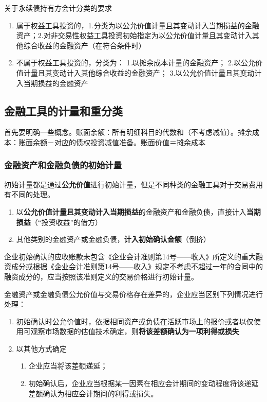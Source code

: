 \documentclass[UTF8,12pt]{ctexart}
\numberwithin{equation}{section} %
\numberwithin{figure}{section}
\numberwithin{table}{section}
\begin{document}
	关于永续债持有方会计分类的要求
	\begin{enumerate}
		\item 属于权益工具投资的，1.分类为以公允价值计量且其变动计入当期损益的金融资产；2.对非交易性权益工具投资初始指定为以公允价值计量且其变动计入其他综合收益的金融资产（在符合条件时）
		
		\item 不属于权益工具投资的，分类为：
		1.以摊余成本计量的金融资产；
		2.以公允价值计量且其变动计入其他综合收益的金融资产；
		3.以公允价值计量且其变动计入当期损益的金融资产
		
	\end{enumerate}
	
	\subsection{金融工具的计量和重分类}
	首先要明确一些概念。账面余额：所有明细科目的代数和（不考虑减值）。摊余成本：账面余额－对应的债权投资减值准备。账面价值＝摊余成本
	
	\subsubsection{金融资产和金融负债的初始计量}
	初始计量都是通过\textbf{公允价值}进行初始计量，但是不同种类的金融工具对于交易费用有不同的处理。
	\begin{enumerate}
		\item 以\textbf{公允价值计量且其变动计入当期损益}的金融资产和金融负债，直接计入\textbf{当期损益}（“投资收益”的借方）
		
		\item 其他类别的金融资产或金融负债，\textbf{计入初始确认金额}（倒挤）
	\end{enumerate}

	企业初始确认的应收账款未包含《企业会计准则第14号——收入》所定义的重大融资成分或根据《企业会计准则第14号——收入》规定不考虑不超过一年的合同中的融资成分的，应当按照该准则定义的交易价格进行初始计量。
	
	金融资产或金融负债公允价值与交易价格存在差异的，企业应当区别下列情况进行处理：
	\begin{enumerate}
		\item 初始确认时公允价值时，依据相同资产或负债在活跃市场上的报价或者以仅使用可观察市场数据的估值技术确定，则\textbf{将该差额确认为一项利得或损失}
		
		\item 以其他方式确定
		\begin{enumerate}
			\item 企业应当将该差额递延；
			
			\item 初始确认后，企业应当根据某一因素在相应会计期间的变动程度将该递延差额确认为相应会计期间的利得或损失。
		\end{enumerate}
	\end{enumerate}
\end{document}
